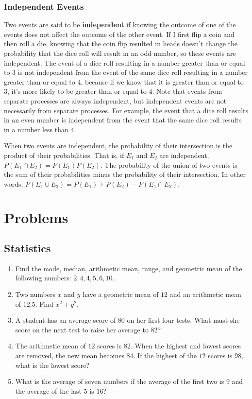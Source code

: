 \documentclass[twocolumn]{article}
\begin{document}
	\subsubsection*{Independent Events}
	Two events are said to be \textbf{independent} if knowing the outcome of one
	of the events does not affect the outcome of the other event. If I first
	flip a coin and then roll a die, knowing that the coin flip resulted in
	heads doesn't change the probability that the dice roll will result in an
	odd number, so these events are independent. The event of a dice roll
	resulting in a number greater than or equal to $3$ is not independent from
	the event of the same dice roll resulting in a number greater than or equal
	to $4$, because if we know that it is greater than or equal to $3$, it's
	more likely to be greater than or equal to $4$. Note that events from
	separate processes are always independent, but independent events are not
	necessarily from separate processes. For example, the event that a dice roll
	results in an even number is independent from the event that the same dice
	roll results in a number less than $4$.

	When two events are independent, the probability of their intersection is
	the product of their probabilities. That is, if $E_1$ and $E_2$ are
	independent, $P(E_1 \cap E_2) = P(E_1)P(E_2)$. The probability of the union
	of two events is the sum of their probabilities minus the probability of
	their intersection. In other words, $P(E_1 \cup E_2) = P(E_1) + P(E_2) -
	P(E_1 \cap E_2)$.

	\section*{Problems}

	\subsection*{Statistics}
	\begin{enumerate}
		\item Find the mode, median, arithmetic mean, range, and geometric mean
			of the following numbers: $2, 4, 4, 5, 6, 10$.
			\vspace{3cm}
		\item Two numbers $x$ and $y$ have a geometric mean of $12$ and an
			arithmetic mean of $12.5$. Find $x^2 + y^2$.
			\vspace{3cm}
		\item A student has an average score of $80$ on her first four tests.
			What must she score on the next test to raise her average to $82$?
			\vspace{3cm}
		\item The arithmetic mean of $12$ scores is $82$. When the highest and
			lowest scores are removed, the new mean becomes $84$. If the highest
			of the $12$ scores is $98$, what is the lowest score?
			\vspace{3cm}
		\item What is the average of seven numbers if the average of the first
			two is $9$ and the average of the last $5$ is $16$?
			\vspace{3cm}
	\end{enumerate}
\end{document}
